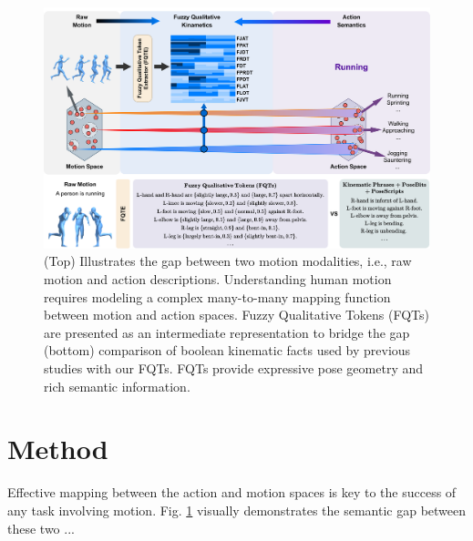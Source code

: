 \begin{figure}[!t]
	\centering
	\includegraphics[width=1\textwidth]{figures/chapter3/fig_semantic_gap}
	\caption{(Top) Illustrates the gap between two motion modalities, i.e., raw motion and action descriptions. Understanding human motion requires modeling a complex many-to-many mapping function between motion and action spaces. Fuzzy Qualitative Tokens (FQTs) are presented as an intermediate representation to bridge the gap (bottom) comparison of boolean kinematic facts used by previous studies \cite{kinematic-phrases, pose_bits, pose_script} with our FQTs. FQTs provide expressive pose geometry and rich semantic information.}
	\label{fig_gap}
\end{figure}




\section{Method}
\noindent
Effective mapping between the action and motion spaces is key to the success of any task involving motion. Fig. \ref{fig_gap} visually demonstrates the semantic gap between these two ...

